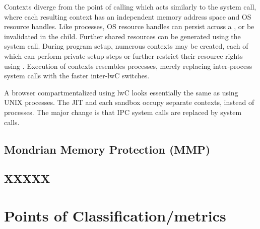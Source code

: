 Contexts diverge from the point of calling  which acts similarly
to the  system call, where each resulting context has an 
independent memory address space and OS resource handles.
Like processes, OS resource handles can persist across a , or be
invalidated in the child.
Further shared resources can be generated using the  system 
call.
During program setup, numerous contexts may be created, each of which can
perform private setup steps or further restrict their resource rights using
.
Execution of contexts resembles processes, merely replacing inter-process system
calls with the faster inter-lwC switches.

A browser compartmentalized using lwC looks essentially the same as
using UNIX processes. 
The JIT and each sandbox occupy separate contexts, instead of processes.
The major change is that IPC system calls are replaced by 
system calls.

\subsection{Mondrian Memory Protection (MMP)}





\subsection{XXXXX}





\section{Points of Classification/metrics}


